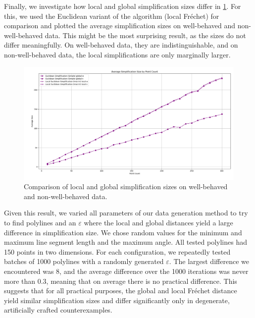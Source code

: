 Finally, we investigate how local and global simplification sizes differ in \cref{fig:res-local-global}. For this, we used the Euclidean variant of the \citeauthor{computational_geometric_methods_for_polygonal_approximations_of_a_curve} algorithm (local Fréchet) for comparison and plotted the average simplification sizes on well-behaved and non-well-behaved data. This might be the most surprising result, as the sizes do not differ meaningfully. On well-behaved data, they are indistinguishable, and on non-well-behaved data, the local simplifications are only marginally larger.

\begin{figure}[b]
  \centering
	\includegraphics[scale=0.4]{./figures/res_local_global.png}
  \caption{Comparison of local and global simplification sizes on well-behaved and non-well-behaved data.}
  \label{fig:res-local-global}
\end{figure}

Given this result, we varied all parameters of our data generation method to try to find polylines and an \(\varepsilon\) where the local and global distances yield a large difference in simplification size. We chose random values for the minimum and maximum line segment length and the maximum angle. All tested polylines had 150 points in two dimensions. For each configuration, we repeatedly tested batches of 1000 polylines with a randomly generated \(\varepsilon\). The largest difference we encountered was 8, and the average difference over the 1000 iterations was never more than 0.3, meaning that on average there is no practical difference. This suggests that for all practical purposes, the global and local Fréchet distance yield similar simplification sizes and differ significantly only in degenerate, artificially crafted counterexamples.
